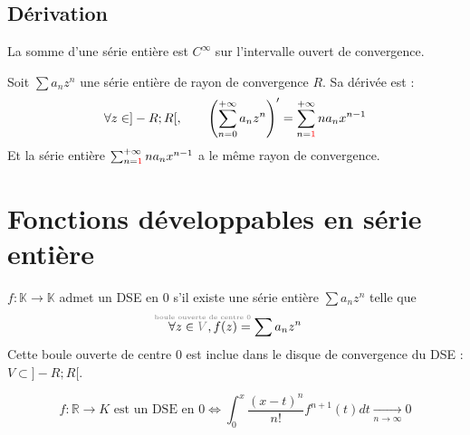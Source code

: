 \documentclass[11pt,a4paper,fleqn,pdftex]{report}
\begin{document}
\subsection{Dérivation} %
\label{sub:derivation_DSE}
\begin{theorem}
     La somme d'une série entière est $C^\infty$ sur l'intervalle ouvert de convergence.
\end{theorem}
\begin{itheorem}
     Soit $\sum a_n z^n$ une série entière de rayon de convergence $R$. Sa dérivée est :
     \begin{equation}
     \forall z\in ]-R;R[,\qquad \left( \sum_{n=0}^{+\infty} a_n z^n \right)' = \sum_{n=\textcolor{couleurImp}{1}}^{+\infty} n a_n x^{n-1} 
     \end{equation}
     Et la série entière $\sum_{n=\textcolor{couleurImp}{1}}^{+\infty} n a_n x^{n-1}$ a le même rayon de convergence.
\end{itheorem}
\section{Fonctions développables en série entière} %
\label{sec:fonctions_DSE}
\begin{dfn}
$f:\mathbb{K}\to\mathbb{K}$ admet un DSE en $0$ s'il existe une série entière $\sum a_n z^n$ telle que
\begin{equation}
\forall z \in \textcolor{gray}{\overset{\mathclap{\text{\begin{tiny}
boule ouverte de centre 0
\end{tiny}}}}{V}}, f(z) = \sum a_n z^{n}
\end{equation}
Cette boule ouverte de centre $0$ est inclue dans le disque de convergence du \gls{DSE} : $V \subset ]-R ; R[$.
\end{dfn}

\begin{theorem} %

\[
f:\mathbb{R}\rightarrow K\text{ est un DSE en 0}\Leftrightarrow \boxed{\displaystyle \int_0^x \dfrac{(x-t)^n}{n!}f^{n+1}(t) dt \underset{n\to\infty}{\to}0}
\]

\end{theorem}
\end{document}
